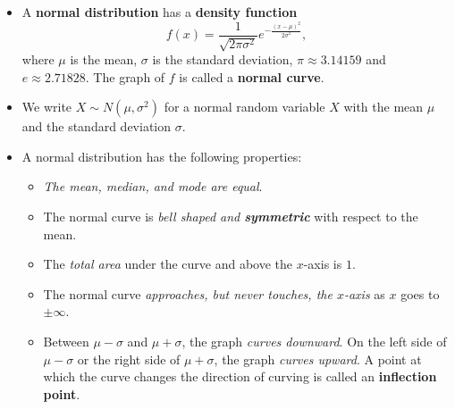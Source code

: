 \begin{itemize}
\item
  A \textbf{normal distribution} has a \textbf{density function}
  \[f(x)=\frac{1}{\sqrt{2\pi \sigma^2}}e^{-\frac{(x-\mu)^2}{2\sigma^2}},\]
  where \(\mu\) is the mean, \(\sigma\) is the standard deviation,
  \(\pi\approx 3.14159\) and \(e\approx 2.71828\). The graph of \(f\) is
  called a \textbf{normal curve}.
\item
  We write \(X\sim N(\mu, \sigma^2)\) for a normal random variable \(X\)
  with the mean \(\mu\) and the standard deviation \(\sigma\).
\item
  A normal distribution has the following properties:

  \begin{itemize}
  \item
    \emph{The mean, median, and mode are equal}.
  \item
    The normal curve is \emph{bell shaped and \textbf{symmetric}} with
    respect to the mean.
  \item
    The \emph{total area} under the curve and above the \(x\)-axis is
    \(1\).
  \item
    The normal curve \emph{approaches, but never touches, the
    \(x\)-axis} as \(x\) goes to \(\pm\infty\).
  \item
    Between \(\mu-\sigma\) and \(\mu+\sigma\), the graph \emph{curves
    downward}. On the left side of \(\mu-\sigma\) or the right side of
    \(\mu+\sigma\), the graph \emph{curves upward}. A point at which the
    curve changes the direction of curving is called an
    \textbf{inflection point}.
  \end{itemize}
\end{itemize}

